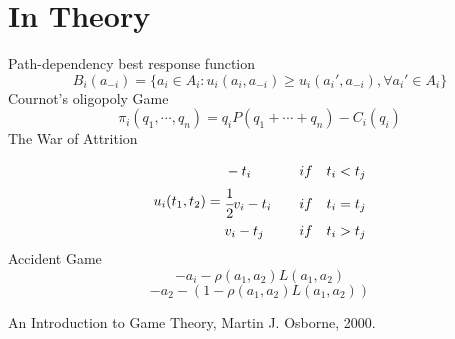 \documentclass[a4paper, 10pt]{article}
\begin{document}
\section{In Theory}
Path-dependency 
best response function
\[ B_i(a_{-i}) = \{a_i \in A_i: u_i(a_i, a_{-i}) \ge u_i(a_i\prime, a_{-i}), \forall a_i\prime \in A_i\}\]
Cournot's oligopoly Game
\[ \pi_i (q_1, \cdots, q_n) = q_iP(q_1 + \cdots + q_n) - C_i(q_i)\]
The War of Attrition

\begin{equation}
     u_i(t_1,t_2) =
    \begin{aligned}
        & -t_i \quad &if \quad t_i < t_j\\
        & \cfrac{1}{2}v_i - t_i \quad &if \quad t_i = t_j\\
        & v_i - t_j \quad &if \quad t_i > t_j
    \end{aligned}
\end{equation} 
Accident Game
\[ -a_i -\rho (a_1,a_2) L(a_1,a_2)\]
\[ -a_2 - (1 - \rho (a_1, a_2)L(a_1,a_2))\]
\begin{thebibliography}{10}
 An Introduction to Game Theory, Martin J. Osborne, 2000. 
\end{thebibliography}
\end{document}
